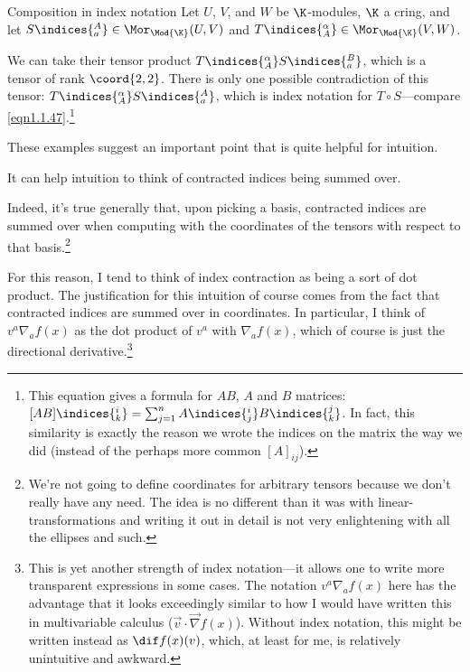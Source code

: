 \begin{exm}{Composition in index notation}{}
	Let $U$, $V$, and $W$ be $\K$-modules, $\K$ a cring, and let $S\indices{^A_a}\in \Mor _{\Mod{\K}}(U,V)$ and $T\indices{^{\alpha}_A}\in \Mor _{\Mod{\K}}(V,W)$.
	
	We can take their tensor product $T\indices{^{\alpha}_A}S\indices{^B_a}$, which is a tensor of rank $\coord{2,2}$.  There is only one possible contradiction of this  tensor:  $T\indices{^{\alpha}_A}S\indices{^A_a}$, which is index notation for $T\circ S$---compare \eqref{eqn1.1.47}.\footnote{This equation gives a formula for $AB$, $A$ and $B$ matrices:  $[AB]\indices{^i_k}=\sum _{j=1}^nA\indices{^i_j}B\indices{^j_k}$.  In fact, this similarity is exactly the reason we wrote the indices on the matrix the way we did (instead of the perhaps more common $[A]_{ij}$).}
\end{exm}
These examples suggest an important point that is quite helpful for intuition.
\begin{displayquote}
	It can help intuition to think of contracted indices being summed over.
\end{displayquote}
Indeed, it's true generally that, upon picking a basis, contracted indices are summed over when computing with the coordinates of the tensors with respect to that basis.\footnote{We're not going to define coordinates for arbitrary tensors because we don't really have any need.  The idea is no different than it was with linear-transformations and writing it out in detail is not very enlightening with all the ellipses and such.}

For this reason, I tend to think of index contraction as being a sort of dot product.  The justification for this intuition of course comes from the fact that contracted indices are summed over in coordinates.  In particular, I think of $v^a\nabla _af(x)$ as the dot product of $v^a$ with $\nabla _af(x)$, which of course is just the directional derivative.\footnote{This is yet another strength of index notation---it allows one to write more transparent expressions in some cases.  The notation $v^a\nabla _af(x)$ here has the advantage that it looks exceedingly similar to how I would have written this in multivariable calculus ($\vec{v}\cdot \vec{\nabla}f(x)$).  Without index notation, this might be written instead as $\dif f(x)(v)$, which, at least for me, is relatively unintuitive and awkward.}


